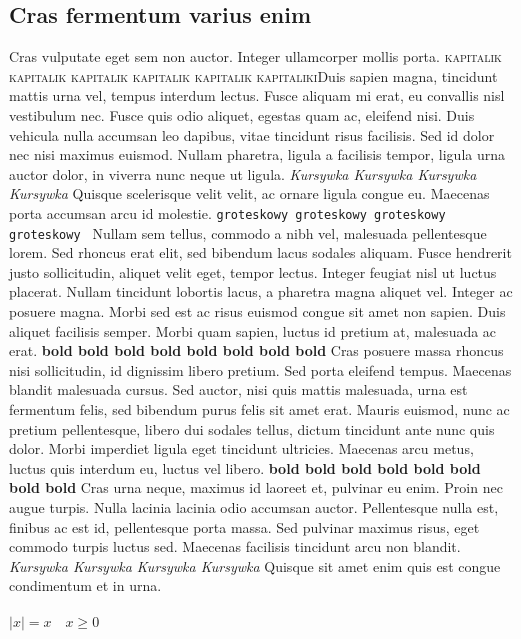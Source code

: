 \documentclass[12pt,a4paper]{article}
\begin{document}
\subsection{Cras fermentum varius enim \cite{boney}}
Cras vulputate eget sem non auctor. Integer ullamcorper mollis porta.  \textsc{kapitalik kapitalik kapitalik kapitalik kapitalik kapitaliki}Duis sapien magna, tincidunt mattis urna vel, tempus interdum lectus. Fusce aliquam mi erat, eu convallis nisl vestibulum nec. Fusce quis odio aliquet, egestas quam ac, eleifend nisi. Duis vehicula nulla accumsan leo dapibus, vitae tincidunt risus facilisis. Sed id dolor nec nisi maximus euismod. Nullam pharetra, ligula a facilisis tempor, ligula urna auctor dolor, in viverra nunc neque ut ligula. \textit{Kursywka Kursywka Kursywka Kursywka} Quisque scelerisque velit velit, ac ornare ligula congue eu. Maecenas porta accumsan arcu id molestie. \texttt{groteskowy groteskowy groteskowy groteskowy } Nullam sem tellus, commodo a nibh vel, malesuada pellentesque lorem. Sed rhoncus erat elit, sed bibendum lacus sodales aliquam. Fusce hendrerit justo sollicitudin, aliquet velit eget, tempor lectus. Integer feugiat nisl ut luctus placerat. Nullam tincidunt lobortis lacus, a pharetra magna aliquet vel. Integer ac posuere magna. Morbi sed est ac risus euismod congue sit amet non sapien. Duis aliquet facilisis semper. Morbi quam sapien, luctus id pretium at, malesuada ac erat.   \textbf{bold bold bold bold bold bold bold bold} Cras posuere massa rhoncus nisi sollicitudin, id dignissim libero pretium. Sed porta eleifend tempus. Maecenas blandit malesuada cursus. Sed auctor, nisi quis mattis malesuada, urna est fermentum felis, sed bibendum purus felis sit amet erat. Mauris euismod, nunc ac pretium pellentesque, libero dui sodales tellus, dictum tincidunt ante nunc quis dolor. Morbi imperdiet ligula eget tincidunt ultricies. Maecenas arcu metus, luctus quis interdum eu, luctus vel libero. \textbf{bold bold bold bold bold bold bold bold} Cras urna neque, maximus id laoreet et, pulvinar eu enim. Proin nec augue turpis. Nulla lacinia lacinia odio accumsan auctor. Pellentesque nulla est, finibus ac est id, pellentesque porta massa. Sed pulvinar maximus risus, eget commodo turpis luctus sed. Maecenas facilisis tincidunt arcu non blandit. \textit{Kursywka Kursywka Kursywka Kursywka} Quisque sit amet enim quis est congue condimentum et in urna.\\\\
$|x|=x \quad x\ge 0$\\\\
\end{document}
